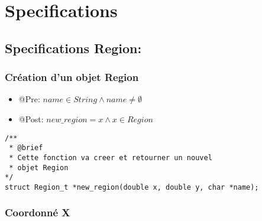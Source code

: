 \section{Specifications}\label{specifications}

\subsection{Specifications Region:}


\subsubsection{Création d'un objet Region}

\begin{itemize}
    \item @Pre: $name \in String \land name \ne \emptyset$
    \item @Post: $new\_region = x \land x \in Region$ 
\end{itemize}

\begin{lstlisting}
/**
 * @brief 
 * Cette fonction va creer et retourner un nouvel 
 * objet Region
*/
struct Region_t *new_region(double x, double y, char *name);
\end{lstlisting}


\subsubsection{Coordonné X}

